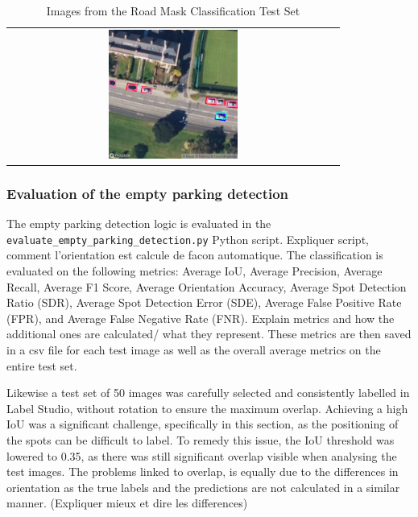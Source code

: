 \begin{table}[h]
\begin{tabular}{cc}
    \multicolumn{2}{c}{\includegraphics[width=0.4\textwidth]{images/image5_road_mask_classification_test_set.png}}                                                                          \\
  \end{tabular}
  \caption{Images from the Road Mask Classification Test Set}
  \label{tab:test_images1}
\end{table}

\subsubsection{Evaluation of the empty parking detection}
The empty parking detection logic is evaluated in the \texttt{evaluate\_empty\_parking\_detection.py} Python script.
Expliquer script, comment l'orientation est calcule de facon automatique.
The classification is evaluated on the following metrics: Average IoU, Average Precision, Average Recall, Average F1 Score, Average Orientation Accuracy, Average Spot Detection Ratio (SDR), Average Spot Detection Error (SDE), Average False Positive Rate (FPR), and Average False Negative Rate (FNR).
Explain metrics and how the additional ones are calculated/ what they represent.
These metrics are then saved in a csv file for each test image as well as the overall average metrics on the entire test set.

Likewise a test set of 50 images was carefully selected and consistently labelled in Label Studio, without rotation to ensure the maximum overlap.
Achieving a high IoU was a significant challenge, specifically in this section, as the positioning of the spots can be difficult to label.
To remedy this issue, the IoU threshold was lowered to 0.35, as there was still significant overlap visible when analysing the test images.
The problems linked to overlap, is equally due to the differences in orientation as the true labels and the predictions are not calculated in a similar manner. (Expliquer mieux et dire les differences)

